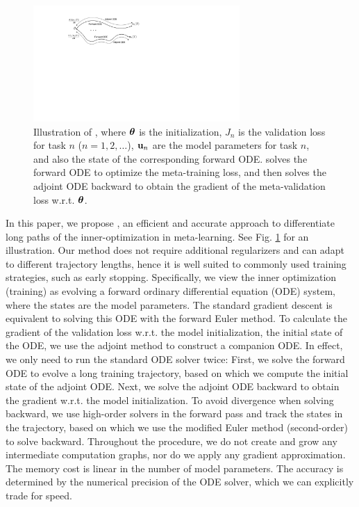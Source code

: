 \begin{figure}
	\centering
	\includegraphics[width=0.7\textwidth]{./figs/amaml-idea-trim.pdf}
	\caption{\small  Illustration of \ours, where $\boldsymbol{\theta}$ is the initialization, $J_n$ is the validation loss for task $n$ ($n=1, 2, \ldots$),  ${\bf u}_n$ are the model parameters for task $n$, and also the state of the corresponding forward ODE. \ours solves the forward ODE to optimize the meta-training loss, and then solves the adjoint ODE backward to obtain the gradient of the meta-validation loss w.r.t. $\boldsymbol{\theta}$. } 	
	\label{fig:amaml}
\end{figure}

In this paper, we propose \ours, an efficient and accurate approach to differentiate long paths of the inner-optimization in meta-learning. See Fig. \ref{fig:amaml} for an illustration. Our method does not require additional regularizers and can adapt to different trajectory lengths, hence it is well suited to commonly used training strategies, such as early stopping.  Specifically, we view the inner optimization (training) as evolving a forward ordinary differential equation (ODE) system, where the states are the model parameters. The standard gradient descent is equivalent to solving this ODE with the forward Euler method.  To calculate the gradient of the validation loss w.r.t. the model initialization, \ie the initial state of the ODE, we use the adjoint method to construct a companion  ODE. In effect, we only need to run the standard ODE solver twice: First, we solve the forward ODE to evolve a long training trajectory, based on which we compute the initial state of the adjoint ODE. Next, we solve the adjoint ODE backward to obtain the gradient w.r.t. the model initialization. To avoid divergence when solving backward, we use high-order solvers in the forward pass and track the states in the trajectory, based on which we use the modified Euler method (second-order) to solve backward. Throughout the procedure, we do not create and grow any intermediate computation graphs, nor do we apply any gradient approximation. The memory cost is linear in the number of model parameters. The accuracy is determined by the numerical precision of the ODE solver, which we can explicitly trade for speed.

